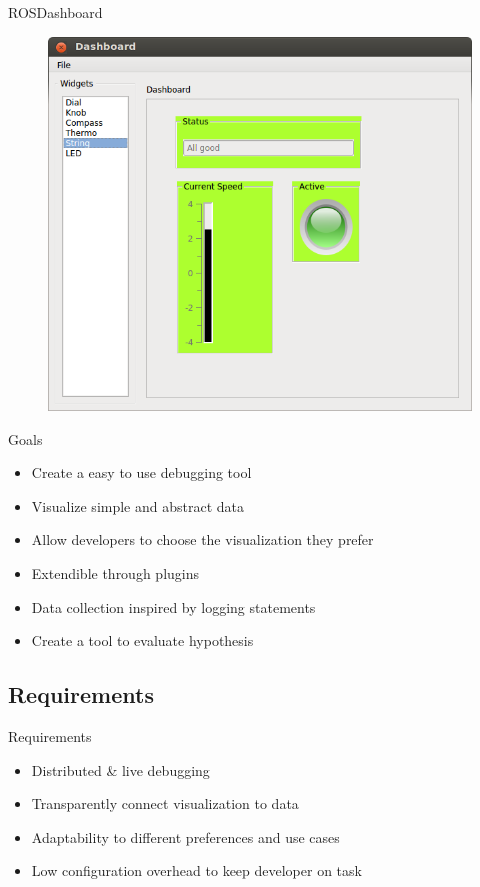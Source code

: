 \documentclass[compress]{beamer}
\begin{document}
\begin{frame}{ROSDashboard}
\begin{figure}[t]
    \centering
    \includegraphics[height=.7\textheight]{images/rosdashboard_screenshot.png}
\end{figure}
\end{frame}

\begin{frame}{Goals}
\begin{itemize}
\item Create a easy to use debugging tool
\item Visualize simple and abstract data
\item Allow developers to choose the visualization they prefer
\item Extendible through plugins
\item Data collection inspired by logging statements
\item Create a tool to evaluate hypothesis
\end{itemize}
\end{frame}

\subsection{Requirements}
\begin{frame}{Requirements}
\begin{itemize}
\item Distributed \& live debugging
\item Transparently connect visualization to data
\item Adaptability to different preferences and use cases
\item Low configuration overhead to keep developer on task
\end{itemize}
\end{frame}
\end{document}
